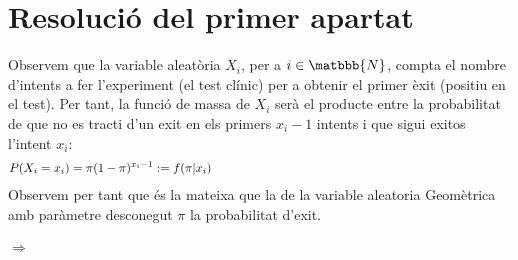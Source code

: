 \documentclass[12pt]{article}
\begin{document}
\section{Resolució del primer apartat}
Observem que la variable aleatòria $X_i$, per a $i\in\matbbb{N}$, 
compta el nombre d'intents a fer l'experiment (el test clínic) per a obtenir el primer èxit (positiu en el test). Per tant, la funció de massa de $X_i$  serà el producte entre la probabilitat de que no es tracti d'un exit en els primers $x_i-1$ intents i que sigui exitos l'intent $x_i$:
\begin{multline*}
P(X_i = x_i)=\pi(1-\pi)^{x_i-1} :=f(\pi|x_i) \textcolor{white}{qqqqqqqqqqqqqqqqqqqqqqqqqqqqqqqqqqqqqqqqqqqqqqqqqqq}
\end{multline*}
Observem per tant que és la mateixa que la de la variable aleatoria Geomètrica amb paràmetre desconegut $\pi$ la probabilitat d'exit.\\\\
$\Longrightarrow$ 
\newpage
\end{document}
